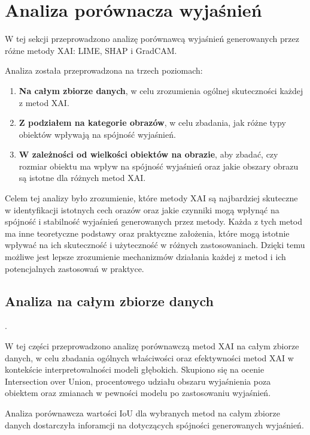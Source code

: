 \section*{Analiza porównacza wyjaśnień}
W tej sekcji przeprowadzono analizę porównawcą wyjaśnień generowanych przez różne metody XAI: LIME, SHAP i GradCAM.

Analiza została przeprowadzona na trzech poziomach:
\begin{enumerate}
	\item \textbf{Na całym zbiorze danych}, w celu zrozumienia ogólnej skuteczności każdej z metod XAI.
	\item \textbf{Z podziałem na kategorie obrazów}, w celu zbadania, jak różne typy obiektów wpływają na spójność wyjaśnień.
	\item \textbf{W zależności od wielkości obiektów na obrazie}, aby zbadać, czy rozmiar obiektu ma wpływ na spójność wyjaśnień oraz jakie obszary obrazu są istotne dla różnych metod XAI.
\end{enumerate}

Celem tej analizy było zrozumienie, które metody XAI są najbardziej skuteczne w identyfikacji istotnych cech orazów oraz jakie czynniki mogą wpłynąć na spójność i stabilność wyjaśnień generowanych przez metody.
Każda z tych metod ma inne teoretyczne podstawy oraz praktyczne założenia, które mogą istotnie wpływać na ich skuteczność i użyteczność w różnych zastosowaniach.
Dzięki temu możliwe jest lepsze zrozumienie mechanizmów działania każdej z metod i ich potencjalnych zastosowań w praktyce.

\subsection*{Analiza na całym zbiorze danych}.

W tej części przeprowadzono analizę porównawczą metod XAI na całym zbiorze danych, w celu zbadania ogólnych właściwości oraz efektywności metod XAI w kontekście interpretowalności modeli głębokich.
Skupiono się na ocenie Intersection over Union, procentowego udziału obszaru wyjaśnienia poza obiektem oraz zmianach w pewności modelu po zastosowaniu wyjaśnień.

\vspace{1cm}

Analiza porównawcza wartości IoU dla wybranych metod na całym zbiorze danych dostarczyła inforamcji na dotyczących spójności generowanych wyjaśnień.

